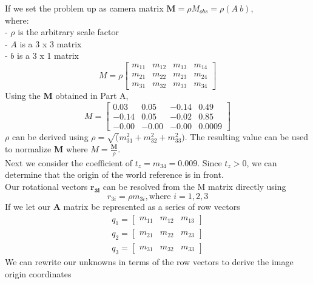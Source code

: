 \documentclass[12pt]{report}
\begin{document}
\begin{enumerate}
\begin{enumerate}
    If we set the problem up as camera matrix  \( \mathbf{M} = \rho M_{obs} = \rho (A \  b) \), \\
    where: \\
    - $\rho$ is the arbitrary scale factor \\
    - $A$ is a 3 x 3 matrix \\
    - $b$ is a 3 x 1 matrix \\
    $$
    M = \rho
    \begin{bmatrix}
    m_{11} & m_{12} & m_{13} & m_{14} \\
    m_{21} & m_{22} & m_{23} & m_{24} \\
    m_{31} & m_{32} & m_{33} & m_{34}
    \end{bmatrix}
    $$
    Using the \textbf{M} obtained in Part A,
    $$
    M = \begin{bmatrix}
    0.03 & 0.05 & -0.14 & 0.49 \\
    -0.14 & 0.05 & -0.02 & 0.85 \\
    -0.00 & -0.00 & -0.00 & 0.0009
    \end{bmatrix}
    $$
    $\rho$ can be derived using $\rho = \sqrt(m_{31}^2 + m_{32}^2 + m_{33}^2)$. The resulting value can be used to normalize \textbf{M} where $M = \frac{\mathbf{M}}{\rho}$. \\
    Next we consider the coefficient of $t_z = m_{34} = 0.009$. Since $t_z > 0$, we can determine that the origin of the world reference is in front. \\
    Our rotational vectors $\mathbf{r_{3i}}$ can be resolved from the M matrix directly using 
    $$r_{3i} = \rho m_{3i}, \text{where } i=1,2,3$$
    If we let our \textbf{A} matrix be represented as a series of row vectors
    \begin{equation}
    \begin{split}
    q_1 = \begin{bmatrix}m_{11} & m_{12} & m_{13}\end{bmatrix} \\
    q_2 = \begin{bmatrix}m_{21} & m_{22} & m_{23}\end{bmatrix} \\
    q_3 = \begin{bmatrix}m_{31} & m_{32} & m_{33}\end{bmatrix}
    \end{split}
    \end{equation}
    We can rewrite our unknowns in terms of the row vectors to derive the image origin coordinates 

\end{enumerate}
\end{enumerate}
\end{document}
